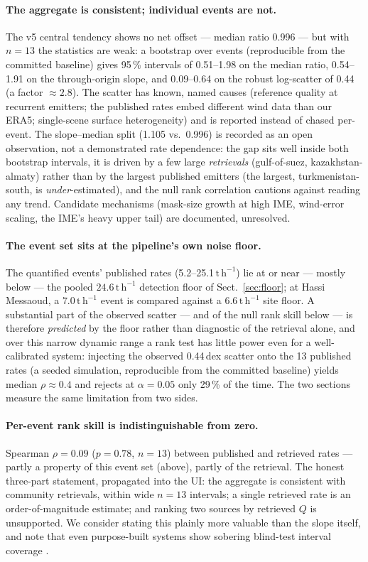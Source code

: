 \documentclass[11pt]{article}
\newcommand{\perh}{\ensuremath{\,\mathrm{t\,h^{-1}}}}
\begin{document}
\paragraph{The aggregate is consistent; individual events are not.}
The v5 central tendency shows no net offset --- median ratio 0.996 ---
but with $n = 13$ the statistics are weak: a bootstrap over events
(reproducible from the committed baseline) gives 95\,\% intervals of
0.51--1.98 on the median ratio, 0.54--1.91 on the through-origin slope,
and 0.09--0.64 on the robust log-scatter of 0.44 (a factor
${\approx}2.8$). The scatter has known, named causes (reference quality
at recurrent emitters; the published rates embed different wind data than
our ERA5; single-scene surface heterogeneity) and is reported instead of
chased per-event.
The slope--median split (1.105 vs.\ 0.996) is recorded as an open
observation, not a demonstrated rate dependence: the gap sits well inside
both bootstrap intervals, it is driven by a few large \emph{retrievals}
(gulf-of-suez, kazakhstan-almaty) rather than by the largest published
emitters (the largest, turkmenistan-south, is \emph{under}-estimated),
and the null rank correlation cautions against reading any trend.
Candidate mechanisms (mask-size growth at high IME, wind-error scaling,
the IME's heavy upper tail) are documented, unresolved.

\paragraph{The event set sits at the pipeline's own noise floor.}
The quantified events' published rates (5.2--25.1\perh) lie at or near
--- mostly below --- the pooled $24.6\perh$ detection floor of
Sect.~\ref{sec:floor}; at Hassi Messaoud, a $7.0\perh$ event is compared
against a $6.6\perh$ site floor. A substantial part of the observed
scatter --- and of the null rank skill below --- is therefore
\emph{predicted} by the floor rather than diagnostic of the retrieval
alone, and over this narrow dynamic range a rank test has little power
even for a well-calibrated system: injecting the observed 0.44\,dex
scatter onto the 13 published rates (a seeded simulation, reproducible
from the committed baseline) yields median $\rho \approx 0.4$ and rejects
at $\alpha = 0.05$ only 29\,\% of the time. The two sections measure the
same limitation from two sides.

\paragraph{Per-event rank skill is indistinguishable from zero.}
Spearman $\rho = 0.09$ ($p = 0.78$, $n = 13$) between published and
retrieved rates --- partly a property of this event set (above), partly
of the retrieval. The honest three-part statement, propagated into the
UI: the aggregate is consistent with community retrievals, within wide
$n{=}13$ intervals; a single retrieved rate is an order-of-magnitude
estimate; and ranking two sources by retrieved $Q$ is unsupported. We consider stating this plainly more valuable than
the slope itself, and note that even purpose-built systems show sobering
blind-test interval coverage \citep{sherwin2024}.
\end{document}
